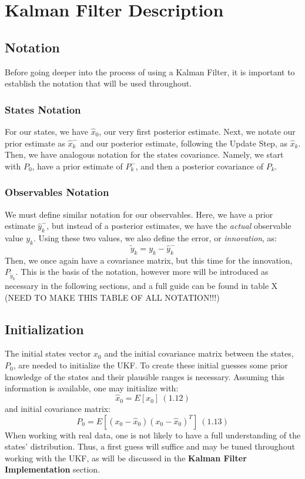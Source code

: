     \section{Kalman Filter Description}
    
    \subsection{Notation}
    Before going deeper into the process of using a Kalman Filter, it is important to establish the notation that will be used throughout. 
    \subsubsection{States Notation}
    For our states, we have $\hat{x}_0$, our very first posterior estimate. Next, we notate our prior estimate as $\hat{x}_k^-$ and our posterior estimate, following the Update Step, as $\hat{x}_k$. Then, we have analogous notation for the states covariance. Namely, we start with $P_0$, have a prior estimate of $P_k^-$, and then a posterior covariance of $P_k$.
    \subsubsection{Observables Notation}
    We must define similar notation for our observables. Here, we have a prior estimate $\hat{y}_k^-$, but instead of a posterior estimates, we have the \emph{actual} observable value $y_k$. Using these two values, we also define the error, or \emph{innovation}, as:
    $$\tilde{y}_k = y_k - \hat{y}_k^-$$
    Then, we once again have a covariance matrix, but this time for the innovation, $P_{\tilde{y}_k}$. This is the basis of the notation, however more will be introduced as necessary in the following sections, and a full guide can be found in table X (NEED TO MAKE THIS TABLE OF ALL NOTATION!!!)
    
    \subsection{Initialization}
    The initial states vector $x_0$ and the initial covariance matrix between the states, $P_0$, are needed to initialize the UKF. To create these initial guesses some prior knowledge of the states and their plausible ranges is necessary. Assuming this information is available, one may initialize with:
    $$\hat{x}_0 = E[x_0] \ (1.12)$$
    and initial covariance matrix:
    $$P_0 = E[(x_0 - \hat{x}_0)(x_0 - \hat{x}_0)^T] \ (1.13) $$
    When working with real data, one is not likely to have a full understanding of the states' distribution. Thus, a first guess will suffice and may be tuned throughout working with the UKF, as will be discussed in the \textbf{Kalman Filter Implementation} section.  
